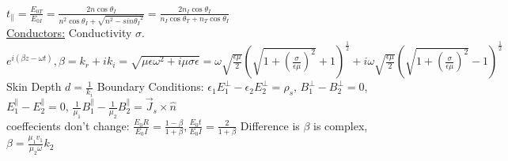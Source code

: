 \documentclass{report}
\begin{document}
$t_\parallel = \frac{E_{0T}}{E_{0I}} = \frac{2n\cos{\theta_I}}{n^2\cos{\theta_I}+\sqrt{n^2-sin{\theta_I}^2}}= \frac{2n_I\cos{\theta_I}}{n_I\cos{\theta_T}+n_T\cos{\theta_I}}$ \\
\underline{Conductors:} Conductivity $\sigma$. $e^{i(\beta z-\omega t)}, \beta = k_r +ik_i = \sqrt{\mu \epsilon \omega^2 + i\mu\sigma\epsilon} = \omega\sqrt{\frac{\epsilon\mu}{2}}\left(\sqrt{1+(\frac{\sigma}{\epsilon\mu})^2}+1\right)^{\frac{1}{2}} + i\omega\sqrt{\frac{\epsilon\mu}{2}}\left(\sqrt{1+(\frac{\sigma}{\epsilon\mu})^2}-1\right)^{\frac{1}{2}}$ \\
Skin Depth $d = \frac{1}{k_i}$ Boundary Conditions: $\epsilon_1 E_1 ^{\perp} - \epsilon_2 E_2 ^{\perp} = \rho_s $,  $ B_1 ^{\perp} -  B_2 ^{\perp}=0$,   $ E_1 ^{\parallel} - E_2 ^{\parallel}=0$, $ \frac{1}{\mu_1} B_1 ^{\parallel} - \frac{1}{\mu_2} B_2 ^{\parallel} = \vec{J}_s \times \hat{n}$ \\
coeffecients don't change: $\frac{E_0R}{E_0I} = \frac{1-\beta}{1+\beta}, \frac{E_0t}{E_0I} = \frac{2}{1+\beta}$ Difference is $\beta$ is complex, $\beta = \frac{\mu_1 v_1}{\mu_2 \omega}k_2$




 
\end{document}

